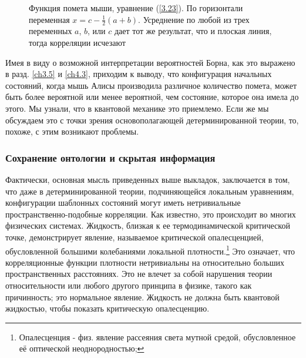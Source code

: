 \documentclass[main.tex]{subfiles}
\begin{document}
\begin{figure}[ht] %
	\begin{center}
		\caption{
		\label{i3.2}Функция помета мыши, уравнение (\ref{3.23}). По горизонтали переменная $x = c - \frac 1 2 (a + b)$. Усреднение по любой из трех переменных $a$, $b$, или $c$ дает тот же результат, что и плоская линия, тогда корреляции исчезают}
	\end {center}
\end {figure}

Имея в виду о возможной интерпретации вероятностей Борна, как это выражено в разд. \ref{ch3.5} и \ref{ch4.3}, приходим к выводу, что конфигурация начальных состояний, когда мышь Алисы производила различное количество помета, может быть более вероятной или менее вероятной, чем состояние, которое она имела до этого. Мы узнали, что в квантовой механике это приемлемо. Если же мы обсуждаем это с точки зрения основополагающей детерминированной теории, то, похоже, с этим возникают проблемы.

\subsubsection{Сохранение онтологии и скрытая информация}\label{ch3.7.1}

Фактически, основная мысль приведенных выше выкладок, заключается в том, что даже в детерминированной теории, подчиняющейся локальным уравнениям, конфигурации шаблонных состояний могут иметь нетривиальные пространственно-подобные корреляции. Как известно,  это происходит во многих физических системах. Жидкость, близкая к ее термодинамической критической точке, демонстрирует явление, называемое критической опалесценцией, обусловленной большими колебаниями локальной плотности.\footnote{Опалесценция - физ. явление рассеяния света мутной средой, обусловленное её оптической неоднородностью; } Это означает, что корреляционные функции плотности нетривиальны на относительно больших пространственных расстояниях. Это не влечет за собой нарушения теории относительности или любого другого принципа в физике, такого как причинность; это нормальное явление. Жидкость не должна быть квантовой жидкостью, чтобы показать критическую опалесценцию.
\end{document}
